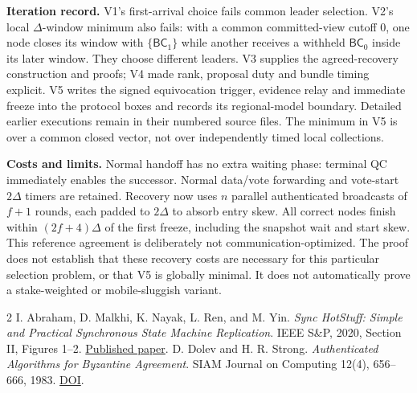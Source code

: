 \documentclass[10pt,a4paper]{article}
\newcommand{\BC}{\mathsf{BC}}
\begin{document}
\textbf{Iteration record.} V1's first-arrival choice fails common leader
selection. V2's local $\Delta$-window minimum also fails: with a common
committed-view cutoff 0, one node closes its window with $\{\BC_1\}$ while
another receives a withheld $\BC_0$ inside its later window. They choose
different leaders. V3 supplies the agreed-recovery construction and proofs;
V4 made rank, proposal duty and bundle timing explicit. V5 writes
the signed equivocation trigger, evidence relay and immediate freeze into
the protocol boxes and records its regional-model boundary. Detailed earlier executions remain in their
numbered source files. The minimum in V5 is over a common closed vector,
not over independently timed local collections.

\textbf{Costs and limits.} Normal handoff has no extra waiting phase:
terminal QC immediately enables the successor. Normal data/vote forwarding
and vote-start $2\Delta$ timers are retained. Recovery now uses $n$ parallel
authenticated broadcasts of $f+1$ rounds, each padded to $2\Delta$ to absorb
entry skew. All correct nodes finish within
$(2f+4)\Delta$ of the first freeze, including the snapshot wait and start
skew. This reference agreement is deliberately not communication-optimized.
The proof does not establish that these recovery costs are necessary for
this particular selection problem, or that V5 is globally minimal. It does
not automatically prove a stake-weighted or mobile-sluggish variant.

\begin{thebibliography}{2}\small
{} I. Abraham, D. Malkhi, K. Nayak, L. Ren, and M. Yin.
\emph{Sync HotStuff: Simple and Practical Synchronous State Machine Replication}.
IEEE S\&P, 2020, Section II, Figures 1--2.
\href{https://conferences.computer.org/sp/pdfs/sp/2020/349700a106.pdf}{Published paper}.
 D. Dolev and H. R. Strong.
\emph{Authenticated Algorithms for Byzantine Agreement}.
SIAM Journal on Computing 12(4), 656--666, 1983.
\href{https://doi.org/10.1137/0212045}{DOI}.
\end{thebibliography}
\end{document}
